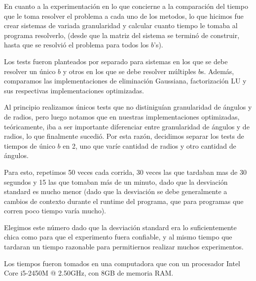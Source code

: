 En cuanto a la experimentación en lo que concierne a la comparación del tiempo que le toma resolver el problema a cada uno de los metodos, lo que hicimos fue crear sistemas de variada granularidad y calcular cuanto tiempo le tomaba al programa resolverlo, (desde que la matriz del sistema se terminó de construir, hasta que se resolvió el problema para todos los $b$'s).

Los tests fueron planteados por separado para sistemas en los que se debe resolver un único $b$ y otros en los que se debe resolver múltiples $b$s. Además, comparamos las implementaciones de eliminación Gaussiana, factorización LU y sus respectivas implementaciones optimizadas.

Al principio realizamos únicos tests que no distiniguían granularidad de ángulos y de radios, pero luego notamos que en nuestras implementaciones optimizadas, teóricamente, iba a ser importante diferenciar entre granularidad de ángulos y de radios, lo que finalmente sucedió. Por esta razón, decidimos separar los tests de tiempos de único $b$ en 2, uno que varíe cantidad de radios y otro cantidad de ángulos.


Para esto, repetimos 50 veces cada corrida, 30 veces las que tardaban mas de 30 segundos y 15 las que tomaban más de un minuto, dado que la desviación standard es mucho menor (dado que la desviación se debe generalmente a cambios de contexto durante el runtime del programa, que para programas que corren poco tiempo varía mucho).

Elegimos este número dado que la desviación standard era lo suficientemente chica como para que el experimento fuera confiable, y al mismo tiempo que tardaran un tiempo razonable para permitiernos realizar muchos experimentos.

Los tiempos fueron tomados en una computadora que con un procesador Intel Core i5-2450M @ 2.50GHz, con 8GB de memoria RAM.